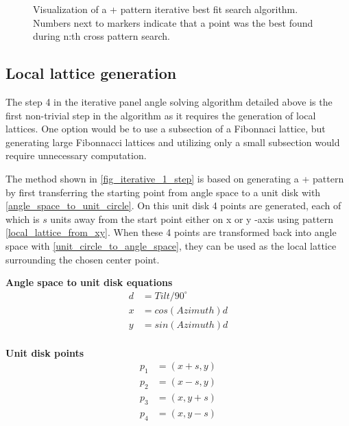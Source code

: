 \begin{figure}[H]
     
\caption{Visualization of a + pattern iterative best fit search algorithm. Numbers next to markers indicate that a point was the best found during n:th cross pattern search.
}
     \label{fig_iterative_visual_1}
\end{figure}

\newpage

\subsection{Local lattice generation}
The step 4 in the iterative panel angle solving algorithm detailed above is the first non-trivial step in the algorithm as it requires the generation of local lattices. One option would be to use a subsection of a Fibonnaci lattice, but generating large Fibonnacci lattices and utilizing only a small subsection would require unnecessary computation. 

The method shown in \ref{fig_iterative_1_step} is based on generating a + pattern by first transferring the starting point from angle space to a unit disk with \ref{angle_space_to_unit_circle}. On this unit disk 4 points are generated, each of which is $s$ units away from the start point either on x or y -axis using pattern \ref{local_lattice_from_xy}. When these 4 points are transformed back into angle space with \ref{unit_circle_to_angle_space}, they can be used as the local lattice surrounding the chosen center point.

\noindent \textbf{Angle space to unit disk equations}
\begin{equation}
\begin{split}
\label{angle_space_to_unit_circle}
d &= Tilt/90^\circ \\
x &= cos(Azimuth)d \\
y &= sin(Azimuth)d \\
\end{split}
\end{equation}


\noindent \textbf{Unit disk points}
\begin{equation}
\begin{split}
\label{local_lattice_from_xy}
p_1 &= (x+s,y) \\
p_2 &= (x-s,y) \\
p_3 &= (x,y+s) \\
p_4 &= (x,y-s) \\
\end{split}
\end{equation}

